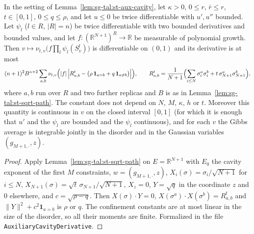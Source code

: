 \begin{lemma}\label{lem:sg-tal:st-aux-derivative}
  \leanok
In the setting of Lemma~\ref{lem:sg-tal:st-aux-cavity}, let $\kappa>0$, $0\le r$, $\bar r\le r$,
$t\in[0,1]$, $0\le q\le\rho$, and let $u\le0$ be twice differentiable with $u',u''$ bounded. Let $\psi_l$
($l\in R$, $|R|=n$) be twice differentiable with two bounded derivatives and bounded values, and let
$f:(\mathbb R^{N+1})^R\to\mathbb R$ be measurable of polynomial growth. Then
$v\mapsto\nu_{t,v}\bigl(f\prod_l\psi_l(S_v^l)\bigr)$ is differentiable on $(0,1)$ and its derivative is at most
\[
(n+1)^2B^{n+2}\sum_{a,b}\nu_{t,v}\Bigl(|f|\,\Bigl|R^t_{a,b}-\bigl(\rho\,\mathbf 1_{a=b}+q\,\mathbf 1_{a\ne b}\bigr)\Bigr|\Bigr),
\qquad
R^t_{a,b}=\frac1{N+1}\Bigl(\sum_{i\le N}\sigma^a_i\sigma^b_i+t\,\sigma^a_{N+1}\sigma^b_{N+1}\Bigr),
\]
where $a,b$ run over $R$ and two further replicas and $B$ is as in Lemma~\ref{lem:sg-tal:st-sqrt-path}.
The constant does not depend on $N$, $M$, $\kappa$, $h$ or $t$.
Moreover this quantity is continuous in $v$ on the closed interval $[0,1]$ (for which it is enough that $u'$ and
the $\psi_l$ are bounded and the $\psi_l$ continuous), and for each $v$ the Gibbs average is integrable jointly in
the disorder and in the Gaussian variables $(g_{M+1,\cdot},z)$.
\end{lemma}
\begin{proof}
  \leanok
Apply Lemma~\ref{lem:sg-tal:st-sqrt-path} on $E=\mathbb R^{N+1}$ with $E_0$ the cavity exponent of the first
$M$ constraints, $w=(g_{M+1,\cdot},z)$, $X_i(\sigma)=\sigma_i/\sqrt{N+1}$ for $i\le N$,
$X_{N+1}(\sigma)=\sqrt t\,\sigma_{N+1}/\sqrt{N+1}$, $X_z=0$, $Y=\sqrt q$ in the coordinate $z$ and $0$
elsewhere, and $c=\sqrt{\rho-q}$. Then $X(\sigma)\cdot Y=0$, $X(\sigma^a)\cdot X(\sigma^b)=R^t_{a,b}$ and
$\|Y\|^2+c^2\mathbf 1_{a=b}$ is $\rho$ or $q$. The confinement constants are at most linear in the size of
the disorder, so all their moments are finite.
Formalized in the file
\texttt{AuxiliaryCavityDerivative}.
\end{proof}

